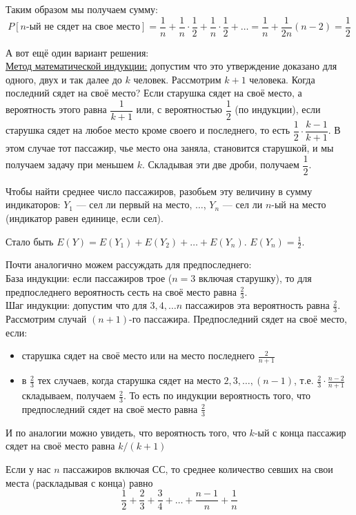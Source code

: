 \documentclass[12pt, a4paper]{article}\usepackage[]{graphicx}\usepackage[]{color}
\begin{document}
\begin{enumerate}
\begin{enumerate}
Таким образом мы получаем сумму:
$$
P[n\text{-ый не сядет на свое место}] = \dfrac{1}{n} + \dfrac{1}{n}\cdot \dfrac{1}{2} + \dfrac{1}{n}\cdot \dfrac{1}{2} + \dots = \dfrac{1}{n}  + \frac{1}{2n}(n-2) = \dfrac{1}{2}
$$
\begin{center}
\end{center}

А вот ещё один вариант решения: \\
\underline{Метод математической индукции:} допустим что это утверждение доказано для одного, двух и так далее до $k$ человек. Рассмотрим $k+1$ человека. Когда последний сядет на своё место? Если старушка сядет на своё место, а вероятность этого равна $\dfrac{1}{k+1}$ или, с вероятностью $\dfrac{1}{2}$ (по индукции), если старушка сядет на любое место кроме своего и последнего, то есть $\dfrac{1}{2}\cdot\dfrac{k-1}{k+1}$. В этом случае тот\vspace{0.2cm} пассажир, чье место  она заняла, становится старушкой, и мы получаем задачу при меньшем $k$. Складывая эти две дроби, получаем $\dfrac{1}{2} $.

Чтобы найти среднее число пассажиров, разобьем эту величину в сумму индикаторов: $Y_1$ — сел ли первый на место, $\dots$, $Y_n$ — сел ли $n$-ый на место (индикатор равен единице, если сел).

Стало быть $E(Y)=E(Y_1)+E(Y_2)+\ldots+E(Y_n)$. $E(Y_n)=\frac{1}{2}$.

Почти аналогично можем рассуждать для предпоследнего:\\
База индукции: если пассажиров трое ($n=3$ включая старушку), то для предпоследнего вероятность сесть на своё место равна $\frac{2}{3}$.\\
Шаг индукции: допустим что для $3, 4, \ldots n$ пассажиров эта вероятность равна $\frac{2}{3}$.
Рассмотрим случай $(n+1)$-го пассажира.
Предпоследний сядет на своё место, если:

\renewcommand{\labelitemi}{\textbullet}

\begin{itemize}
\item старушка сядет на своё место или на место последнего $\frac{2}{n+1}$
\item в $\frac{2}{3}$ тех случаев, когда старушка сядет на место $2, 3, \ldots, (n-1)$, т.е. $\frac{2}{3}\cdot \frac{n-2}{n+1}$
складываем, получаем $\frac{2}{3}$.
То есть по индукции вероятность того, что предпоследний сядет на своё место равна $\frac{2}{3}$
\end{itemize}
И по аналогии можно увидеть, что вероятность того, что $k$-ый с конца пассажир сядет на своё место равна $k/(k+1)$

Если у нас $n$ пассажиров включая СС, то среднее количество севших на свои места (раскладывая с конца) равно $$\frac{1}{2}+\frac{2}{3}+\frac{3}{4}+\dots+\frac{n-1}{n}+\frac{1}{n}$$

\end{enumerate}

\end{enumerate}
\end{document}

